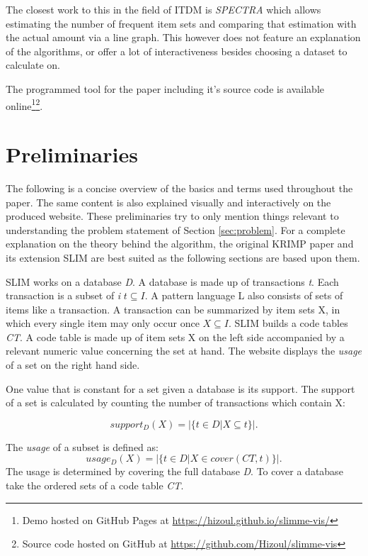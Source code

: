 \documentclass[runningheads]{llncs}
\begin{document}
The closest work to this in the field of ITDM is  \emph{SPECTRA}\cite{spectra} which allows estimating the number of frequent item sets and comparing that estimation with the actual amount via a line graph. This however does not feature an explanation of the algorithms, or offer a lot of interactiveness besides choosing a dataset to calculate on.

The programmed tool for the paper including it's source code is available online\footnote{Demo hosted on GitHub Pages at \url{https://hizoul.github.io/slimme-vis/}}\footnote{Source code hosted on GitHub at \url{https://github.com/Hizoul/slimme-vis}}.

\section{Preliminaries}
\label{sec:preliminaries}
The following is a concise overview of the basics and terms used throughout the paper. The same content is also explained visually and interactively on the produced website.
These preliminaries try to only mention things relevant to understanding the problem statement of Section \ref{sec:problem}.
For a complete explanation on the theory behind the algorithm, the original KRIMP paper\cite{krimp} and its extension SLIM\cite{slim} are best suited as the following sections are based upon them.


SLIM works on a database \emph{D}. A database is made up of transactions \emph{t}. Each transaction is a subset of \emph{i} $t\subseteq I$. A pattern language L also consists of sets of items like a transaction.
A transaction can be summarized by item sets X, in which every single item may only occur once $X \subseteq I$. 
SLIM builds a code tables \emph{CT}. A code table is made up of item sets X on the left side accompanied by a relevant numeric value concerning the set at hand. The website displays the \emph{usage} of a set on the right hand side.

One value that is constant for a set given a database is its support. The support of a set is calculated by counting the number of transactions which contain X:

\begin{equation}
\label{eq:support}
support_D(X) = |\{t \in D | X \subseteq t\}|.
\end{equation}


The \emph{usage} of a subset is defined as:
\begin{equation}
\label{eq:usage}
usage_D(X) = |\{t \in D | X \in cover(CT,t)\}|.
\end{equation}
The usage is determined by covering the full database \emph{D}.
To cover a database take the ordered sets of a code table \emph{CT}.
\end{document}
